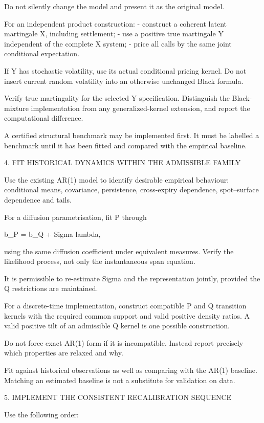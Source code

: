 \documentclass[11pt,a4paper]{article}
\numberwithin{equation}{section}
\theoremstyle{definition}\newtheorem{definition}[theorem]{Definition}
\theoremstyle{remark}\newtheorem{remark}[theorem]{Remark}
\begin{document}
Do not silently change the model and present it as the original model.

For an independent product construction:
- construct a coherent latent martingale X, including settlement;
- use a positive true martingale Y independent of the complete X system;
- price all calls by the same joint conditional expectation.

If Y has stochastic volatility, use its actual conditional pricing
kernel. Do not insert current random volatility into an otherwise
unchanged Black formula.

Verify true martingality for the selected Y specification. Distinguish
the Black-mixture implementation from any generalized-kernel extension,
and report the computational difference.

A certified structural benchmark may be implemented first. It must be
labelled a benchmark until it has been fitted and compared with the
empirical baseline.

4. FIT HISTORICAL DYNAMICS WITHIN THE ADMISSIBLE FAMILY

Use the existing AR(1) model to identify desirable empirical behaviour:
conditional means, covariance, persistence, cross-expiry dependence,
spot–surface dependence and tails.

For a diffusion parametrisation, fit P through

  b_P = b_Q + Sigma lambda,

using the same diffusion coefficient under equivalent measures.
Verify the likelihood process, not only the instantaneous span equation.

It is permissible to re-estimate Sigma and the representation jointly,
provided the Q restrictions are maintained.

For a discrete-time implementation, construct compatible P and Q
transition kernels with the required common support and valid positive
density ratios. A valid positive tilt of an admissible Q kernel is one
possible construction.

Do not force exact AR(1) form if it is incompatible. Instead report
precisely which properties are relaxed and why.

Fit against historical observations as well as comparing with the AR(1)
baseline. Matching an estimated baseline is not a substitute for
validation on data.

5. IMPLEMENT THE CONSISTENT RECALIBRATION SEQUENCE

Use the following order:
\end{document}
